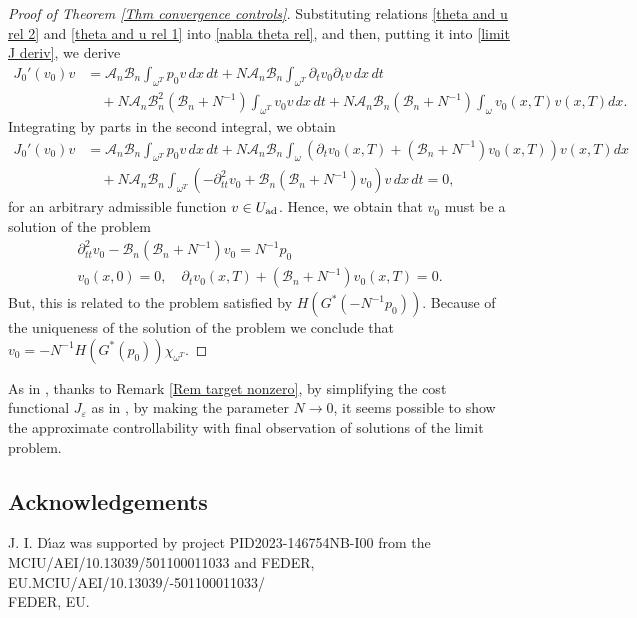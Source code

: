 \documentclass[reqno]{amsart}
\begin{document}
\begin{proof}[Proof of Theorem \ref{Thm convergence controls}]
Substituting relations \eqref{theta and u rel 2} and
\eqref{theta and u rel 1} into \eqref{nabla theta rel}, and then, 
putting it into \eqref{limit J deriv}, we derive
\begin{align*}
J_0'(v_0)v
&=\mathcal{A}_n\mathcal{B}_n\int _{\omega
^{T}}p_0v\,dx\,dt+N\mathcal{A}_n\mathcal{B}_n\int _{\omega
^{T}}\partial _{t}v_0\partial _{t}v\,dx\,dt \\
&\quad +N\mathcal{A}_n\mathcal{B}_n^2(\mathcal{B}_n+N^{-1})\int
_{\omega ^{T}}v_0v\,dx\,dt+N\mathcal{A}_n\mathcal{B}_n(\mathcal{B}%
_n+N^{-1})\int _{\omega }v_0(x,T)v(x,T){dx}.
\end{align*}
Integrating by parts in the second integral, we obtain
\begin{align*}
J_0'(v_0)v
&=\mathcal{A}_n\mathcal{B}_n\int _{\omega
^{T}}p_0v\,dx\,dt+N\mathcal{A}_n\mathcal{B}_n\int _{\omega
}(\partial _{t}v_0(x,T)+(\mathcal{B}_n+N^{-1})v_0(x,T))v(x,T){dx} \\
&\quad +N\mathcal{A}_n\mathcal{B}_n\int _{\omega ^{T}}(-\partial
_{tt}^2v_0+\mathcal{B}_n(\mathcal{B}_n+N^{-1})v_0)v\,dx\,dt=0,
\end{align*}
for an arbitrary admissible function $v\in U_{\rm ad}$. Hence, we obtain that 
$v_0 $ must be a solution of the  problem
\begin{gather*}
\partial _{tt}^2v_0-\mathcal{B}_n(\mathcal{B}_n+N^{-1})v_0=N^{-1}p_0   \\
v_0(x,0)=0,\quad \partial _{t}v_0(x,T)+(\mathcal{B}_n+N^{-1})v_0(x,T)=0. 
\end{gather*}
But, this is related to the problem satisfied by $H(G^{\ast }(-N^{-1}p_0))$. 
Because of the uniqueness of the solution of the problem we conclude that 
$v_0=-N^{-1}H(G^{\ast }(p_0))\chi _{\omega ^{T}}$.
\end{proof}

\begin{remark} \rm
As in \cite{DiPoShRACSAM, DiPoShAttouch}, thanks to
Remark \ref{Rem target nonzero}, by simplifying the cost functional 
$J_{\varepsilon }$ as in \cite{DiPoShRACSAM}, by making the parameter 
$N\to 0$, it seems possible to show the approximate controllability
with final observation of solutions of the limit problem.
\end{remark}

\subsection*{Acknowledgements}
J. I. D\'{\i}az was supported by project PID2023-146754NB-I00 from the
 MCIU/AEI/10.13039/501100011033 and  FEDER,
EU.MCIU/AEI/10.13039/-501100011033/ \\ FEDER, EU.
\end{document}
